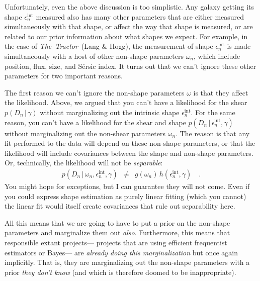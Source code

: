 \documentclass[12pt]{article}
\newcommand{\project}[1]{\textsl{#1}}
\newcommand{\thetractor}{\project{The~Tractor}}
\newcommand{\given}{\,|\,}
\newcommand{\data}{D}
\newcommand{\shear}{\gamma}
\newcommand{\ellip}{\epsilon}
\newcommand{\intrinsic}{\ellip^{\mathrm{int}}}
\newcommand{\nspars}{\omega}
\begin{document}
Unfortunately, even the above discussion is too simplistic.
Any galaxy getting its shape $\intrinsic_n$ measured
  also has many other parameters that are either measured simultaneously with that shape,
  or affect the way that shape is measured,
  or are related to our prior information about what shapes we expect.
For example, in the case of \thetractor\ (Lang \& Hogg),
  the measurement of shape $\intrinsic_n$ is made simultaneously with a host of other
  non-shape parameters $\nspars_n$,
  which include position, flux, size, and S\'ersic index.
It turns out that we can't ignore these other parameters for two important reasons.

The first reason we can't ignore the non-shape parameters $\nspars$ is that they affect the likelihood.
Above, we argued that you can't have a likelihood for the shear $p(\data_n\given\shear)$ 
  without marginalizing out the intrinsic shape $\intrinsic_n$.
For the same reason, you can't have a likelihood for the shear and shape $p(\data_n\given\intrinsic_n,\shear)$
  without marginalizing out the non-shear parameters $\nspars_n$.
The reason is that any fit performed to the data will depend on these non-shape parameters,
  or that the likelihood will include covariances between the shape and non-shape parameters.
Or, technically, the likelihood will not be \emph{separable}:
\begin{eqnarray}
p(\data_n\given\nspars_n,\intrinsic_n,\shear)
  &\ne& g(\nspars_n)\,h(\intrinsic_n,\shear)
  \quad .
\end{eqnarray}
You might hope for exceptions, but I can guarantee they will not come.
Even if you could express shape estimation as purely linear fitting
  (which you cannot)
  the linear fit would itself create covariances that rule out separability here.

All this means that we are going to have to put a prior on the non-shape parameters
  and marginalize them out \emph{also}.
Furthermore, this means that responsible extant projects---%
  projects that are using efficient frequentist estimators or Bayes---%
  are \emph{already doing this marginalization} but once again implicitly.
That is, they are marginalizing out the non-shape parameters with a prior \emph{they don't know}
  (and which is therefore doomed to be inappropriate).
\end{document}
